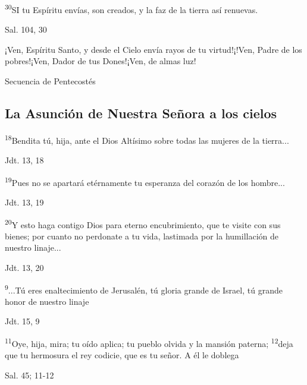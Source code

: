 \documentclass[a4paper,11pt]{article}
\begin{document}
      \textsuperscript{30}SI tu Espíritu envías, son creados, y la faz de la tierra así renuevas.
      \begin{flushright}
        Sal. 104, 30
      \end{flushright}

      ¡Ven, Espíritu Santo, y desde el Cielo envía rayos de tu virtud!¡!Ven, Padre de los pobres!¡Ven, Dador de tus Dones!¡Ven, de almas luz!
      \begin{flushright}
        Secuencia de Pentecostés
      \end{flushright}

    \subsection*{\hfil La Asunción de Nuestra Señora a los cielos \hfil}

      \textsuperscript{18}Bendita tú, hija, ante el Dios Altísimo sobre todas las mujeres de la tierra...
      \begin{flushright}
        Jdt. 13, 18
      \end{flushright}

      \textsuperscript{19}Pues no se apartará etérnamente tu esperanza del corazón de los hombre...
      \begin{flushright}
        Jdt. 13, 19
      \end{flushright}

      \textsuperscript{20}Y esto haga contigo Dios para eterno encubrimiento, que te visite con sus bienes; por cuanto no perdonate
      a tu vida, lastimada por la humillación de nuestro linaje...
      \begin{flushright}
        Jdt. 13, 20
      \end{flushright}

      \textsuperscript{9}...Tú eres enaltecimiento de Jerusalén, tú gloria grande de Israel, tú grande honor de nuestro linaje
      \begin{flushright}
        Jdt. 15, 9
      \end{flushright}

      \textsuperscript{11}Oye, hija, mira; tu oído aplica; tu pueblo olvida y la mansión paterna; \textsuperscript{12}deja que tu hermosura
      el rey codicie, que es tu señor. A él le doblega
      \begin{flushright}
        Sal. 45; 11-12
      \end{flushright}
\end{document}
